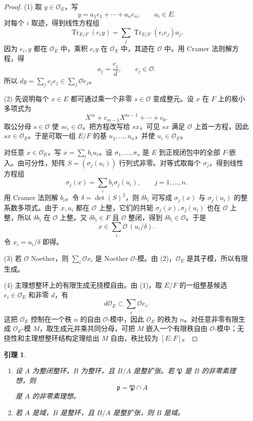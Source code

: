 \documentclass[11pt,a4paper,openany]{ctexbook}
\numberwithin{equation}{chapter}
\newcommand{\Tr}{\operatorname{Tr}}
\theoremstyle{plain}
\newtheorem{lemma}[theorem]{引理}
\theoremstyle{definition}
\theoremstyle{remark}
\begin{document}
\begin{proof}
(1) 取 $y\in\mathcal O_E$，写
\[
y=a_1e_1+\cdots+a_ne_n,\qquad a_i\in E.
\]
对每个 $i$ 取迹，得到线性方程组
\[
\Tr_{E/F}(e_i y)=\sum_j \Tr_{E/F}(e_i e_j)a_j.
\]
因为 $e_i,y$ 都在 $\mathcal O_E$ 中，乘积 $e_i y$ 在 $\mathcal O_E$ 中，其迹在 $\mathcal O$ 中。用 Cramer 法则解方程，得
\[
a_j=\frac{c_j}{d},\qquad c_j\in\mathcal O.
\]
所以 $dy=\sum_j c_j e_j\in\sum_j\mathcal O e_j$。

(2) 先说明每个 $x\in E$ 都可通过乘一个非零 $s\in\mathcal O$ 变成整元。设 $x$ 在 $F$ 上的极小多项式为
\[
X^m+c_{m-1}X^{m-1}+\cdots+c_0.
\]
取公分母 $s\in\mathcal O$ 使 $sc_i\in\mathcal O$。把方程改写给 $sx$，可见 $sx$ 满足 $\mathcal O$ 上首一方程，因此 $sx\in\mathcal O_E$。于是可取一组 $E/F$ 的基 $u_1,\dots,u_n$，并使 $u_i\in\mathcal O_E$。

对任意 $x\in\mathcal O_E$，写 $x=\sum_i b_i u_i$。设 $\sigma_1,\dots,\sigma_n$ 是 $E$ 到正规闭包中的全部 $F$-嵌入。由可分性，矩阵 $S=(\sigma_j(u_i))$ 行列式非零。对等式取每个 $\sigma_j$，得到线性方程组
\[
\sigma_j(x)=\sum_i b_i\sigma_j(u_i),\qquad j=1,\dots,n.
\]
用 Cramer 法则解 $b_i$。令 $\delta=\det(S)^2$，则 $\delta b_i$ 可写成 $\sigma_j(x)$ 与 $\sigma_j(u_i)$ 的整系数多项式。由于 $x,u_i$ 都在 $\mathcal O$ 上整，它们的共轭 $\sigma_j(x),\sigma_j(u_i)$ 也在 $\mathcal O$ 上整，所以 $\delta b_i$ 在 $\mathcal O$ 上整。又 $\delta b_i\in F$ 且 $\mathcal O$ 整闭，得到 $\delta b_i\in\mathcal O$。于是
\[
x\in\sum_i\mathcal O\,(u_i/\delta).
\]
令 $x_i=u_i/\delta$ 即得。

(3) 若 $\mathcal O$ Noether，则 $\sum_i\mathcal O x_i$ 是 Noether $\mathcal O$-模。由 (2)，$\mathcal O_E$ 是其子模，所以有限生成。

(4) 主理想整环上的有限生成无挠模自由。由 (1)，取 $E/F$ 的一组整基候选 $e_i\in\mathcal O_E$ 和非零 $d$，有
\[
d\mathcal O_E\subset\sum_i\mathcal O e_i.
\]
这把 $\mathcal O_E$ 控制在一个秩 $n$ 的自由 $\mathcal O$-模中，因此 $\mathcal O_E$ 的秩为 $n$。对任意非零有限生成 $\mathcal O_E$-模 $M$，取生成元并乘共同分母，可把 $M$ 嵌入一个有限秩自由 $\mathcal O$-模中；无挠性和主理想整环结构定理给出 $M$ 自由，秩比较为 $[E:F]$。
\end{proof}

\begin{lemma}
\begin{enumerate}[label=(\arabic*)]
\item 设 $A$ 为整闭整环，$B$ 为整环，且 $B/A$ 是整扩张。若 $\mathfrak P$ 是 $B$ 的非零素理想，则
\[
\mathfrak p=\mathfrak P\cap A
\]
是 $A$ 的非零素理想。
\item 若 $A$ 是域，$B$ 是整环，且 $B/A$ 是整扩张，则 $B$ 是域。
\end{enumerate}
\end{lemma}
\end{document}
